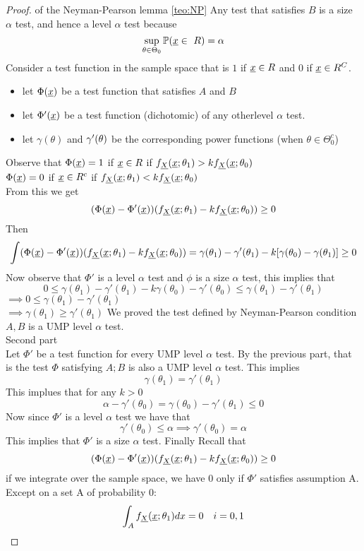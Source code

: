 \begin{proof} of the Neyman-Pearson lemma \ref{teo:NP}
	Any test that satisfies $B$  is a size  $\alpha$ test, and hence a level $\alpha$ test because
	$$\sup_{\theta \in \Theta_0} \mathbb{P}(\underline x \in \ R)=\alpha$$
	Consider a test function in the sample space that is $1$ if $\underline x\in R$ and $0$ if $\underline x\in R^C$.
	\begin{itemize}
		\item let $\Phi(\underline x)$ be a test function that satisfies $A$ and $B$
		\item let $\Phi'(\underline x)$ be a test function (dichotomic) of any otherlevel $\alpha$ test.
		\item let $\gamma(\theta)$ and $\gamma'(\theta)$ be the corresponding power functions (when $\theta \in \Theta_0^c$)
	\end{itemize}
Observe that 
$\Phi(\underline x)=1$ if $\underline x\in R$ if $f_{\underline X}(\underline x;\theta_1) > k f_{\underline X}(\underline x;\theta_0)$\\
$\Phi(\underline x)=0$ if $\underline x\in R^c$ if $f_{\underline X}(\underline x;\theta_1) < k f_{\underline X}(\underline x;\theta_0)$\\
From this we get
$$(\Phi(\underline x)-\Phi'(\underline x))(f_{\underline X}(\underline x;\theta_1)-k f_{\underline X}(\underline x;\theta_0))\geq 0$$
Then
$$\int (\Phi(\underline x)-\Phi'(\underline x))(f_{\underline X}(\underline x;\theta_1)-k f_{\underline X}(\underline x;\theta_0))=\gamma(\theta_1)-\gamma'(\theta_1)-k[\gamma(\theta_0)- \gamma(\theta_1)]\geq 0$$
Now observe that $\Phi'$ is a level $\alpha$ test and $\phi$ is a size $\alpha$ test, this implies that 
$$0	\leq \gamma(\theta_1) -\gamma'(\theta_1) - k \gamma(\theta_0) -\gamma'(\theta_0)\leq \gamma(\theta_1) -\gamma'(\theta_1)$$
$\implies 0\leq \gamma(\theta_1) -\gamma'(\theta_1)$\\
$\implies \gamma(\theta_1) \geq \gamma'(\theta_1)$
We proved the test defined by Neyman-Pearson condition $A,B$ is a UMP level $\alpha$ test.\\
Second part\\
Let $\Phi'$ be a test function for every UMP level $\alpha$ test. By the previous part, that is the test $\Phi$ satisfying $A;B$ is also a UMP level $\alpha$ test. This implies 
$$\gamma(\theta_1)=\gamma'(\theta_1)$$
This implues that for any $k>0$
$$\alpha - \gamma'(\theta_0)=\gamma(\theta_0) - \gamma'(\theta_1)\leq 0$$
Now since $\Phi'$ is a  level $\alpha$ test we have that
$$ \gamma'(\theta_0)\leq \alpha \implies  \gamma'(\theta_0)=\alpha$$
This implies that $\Phi'$ is a size $\alpha$ test. Finally Recall that 
$$(\Phi(\underline x)-\Phi'(\underline x))(f_{\underline X}(\underline x;\theta_1)-k f_{\underline X}(\underline x;\theta_0))\geq 0$$
if we integrate over the sample  space, we have 0 only if $\Phi'$ satisfies assumption A. Except on a set A of probability 0:
$$\int_{A}f_{\uX}(\ux;\te_1)dx=0 \ \ \ i=0,1$$
\end{proof}
